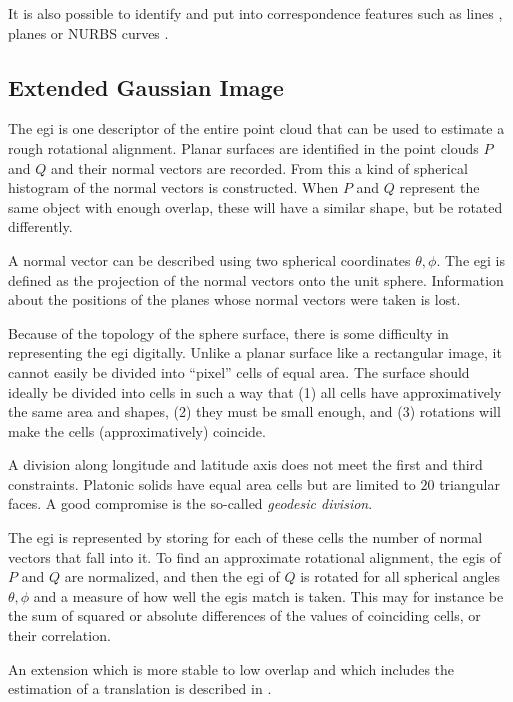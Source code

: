 It is also possible to identify and put into correspondence features such as lines \cite{Lich2011}, planes \cite{Dold2006} or NURBS curves \cite{Koch2008}.


\subsection{Extended Gaussian Image}
The \gls{egi} is one descriptor of the entire point cloud that can be used to estimate a rough rotational alignment. Planar surfaces are identified in the point clouds $P$ and $Q$ and their normal vectors are recorded. \cite{Dold2005} From this a kind of spherical histogram of the normal vectors is constructed. When $P$ and $Q$ represent the same object with enough overlap, these will have a similar shape, but be rotated differently.

A normal vector can be described using two spherical coordinates $\theta, \phi$. The \gls{egi} is defined as the projection of the normal vectors onto the unit sphere. \cite{Horn1984} Information about the positions of the planes whose normal vectors were taken is lost.

Because of the topology of the sphere surface, there is some difficulty in representing the \gls{egi} digitally. Unlike a planar surface like a rectangular image, it cannot easily be divided into ``pixel'' cells of equal area. The surface should ideally be divided into cells in such a way that (1) all cells have approximatively the same area and shapes, (2) they must be small enough, and (3) rotations will make the cells (approximatively) coincide.

A division along longitude and latitude axis does not meet the first and third constraints. Platonic solids have equal area cells but are limited to $20$ triangular faces. A good compromise is the so-called \emph{geodesic division}.

The \gls{egi} is represented by storing for each of these cells the number of normal vectors that fall into it. To find an approximate rotational alignment, the \gls{egi}s of $P$ and $Q$ are normalized, and then the \gls{egi} of $Q$ is rotated for all spherical angles $\theta, \phi$ and a measure of how well the \gls{egi}s match is taken. This may for instance be the sum of squared or absolute differences of the values of coinciding cells, or their correlation.

An extension which is more stable to low overlap and which includes the estimation of a translation is described in \cite{Maka2006}.
